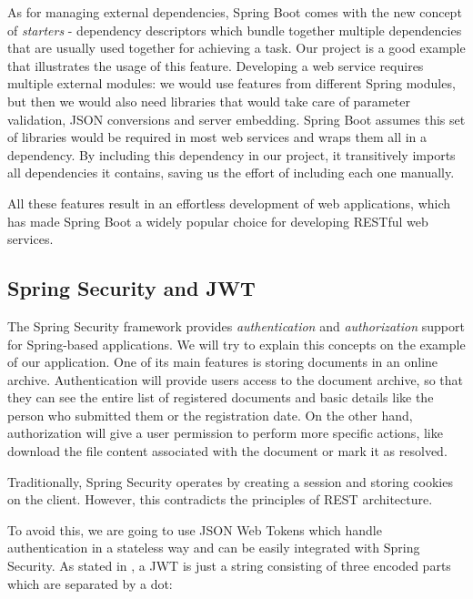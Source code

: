 As for managing external dependencies, Spring Boot comes with the new concept of \textit{starters} - dependency descriptors which bundle together multiple dependencies that are usually used together for achieving a task. Our project is a good example that illustrates the usage of this feature. Developing a web service requires multiple external modules: we would use features from different Spring modules, but then we would also need libraries that would take care of parameter validation, JSON conversions and server embedding. Spring Boot assumes this set of libraries would be required in most web services and wraps them all in a  dependency. By including this dependency in our project, it transitively imports all dependencies it contains, saving us the effort of including each one manually.

All these features result in an effortless development of web applications, which has made Spring Boot a widely popular choice for developing RESTful web services.


\subsection{Spring Security and JWT}
\label{subsection:springSecurityAndJWT}

The Spring Security framework provides \textit{authentication} and \textit{authorization} support for Spring-based applications. We will try to explain this concepts on the example of our application. One of its main features is storing documents in an online archive. Authentication will provide users access to the document archive, so that they can see the entire list of registered documents and basic details like the person who submitted them or the registration date. On the other hand, authorization will give a user permission to perform more specific actions, like download the file content associated with the document or mark it as resolved.

Traditionally, Spring Security operates by creating a session and storing cookies on the client. However, this contradicts the principles of REST architecture.

To avoid this, we are going to use JSON Web Tokens which handle authentication in a stateless way and can be easily integrated with Spring Security. As stated in \cite{buildingRESTfulWebServicesWithSpring}, a JWT is just a string consisting of three encoded parts which are separated by a dot:

